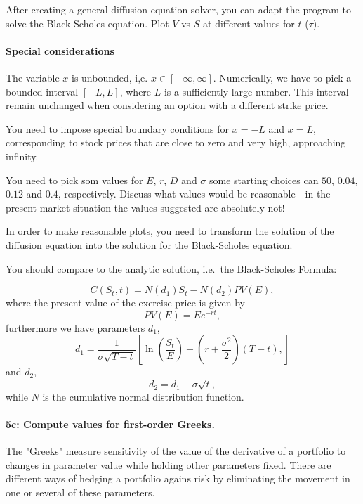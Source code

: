 \documentclass[%
oneside,                 %
final,                   %
10pt]{article}
\begin{document}
After creating a general diffusion equation solver, you
can adapt the program to solve the Black-Scholes equation.
Plot $V$ vs $S$ at different values for $t$ ($\tau$).

\paragraph{Special considerations}
The variable $x$ is unbounded, i,e. $x\in[-\infty, \infty]$. Numerically,
we have to pick a bounded interval $[-L, L]$, where $L$ is a sufficiently 
large number. This interval remain unchanged when considering an option with a
different strike price.

You need to impose special boundary conditions for $x=-L$ and $x=L$, corresponding 
to stock prices that are close to zero and very high, approaching infinity.

You need to pick som values for $E$, $r$, $D$ and $\sigma$ some starting
choices can $50$, $0.04$, $0.12$ and $0.4$, respectively. Discuss what 
values would be reasonable - in the present market situation the values 
suggested are absolutely not!

In order to make reasonable plots, you need to transform the solution of 
the diffusion equation into the solution for the Black-Scholes 
equation. 

You should compare to the analytic solution, i.e.~the Black-Scholes Formula:

\begin{equation}
    C(S_t, t) = N(d_1) S_t - N(d_2) PV(E),
\end{equation}
where the present value of the exercise price is
given by
\begin{equation}
    PV(E) = Ee^{-rt},
\end{equation}
furthermore we have parameters $d_1$,
\begin{equation}    
    d_1 = \frac{1}{\sigma \sqrt{T - t}}
    \left[
        \ln \left(\frac{S_t}{E} \right) 
        + \left(r + \frac{\sigma^2}{2} \right) (T - t),
    \right] 
\end{equation}
and $d_2$,
\begin{equation}
    d_2 = d_1 - \sigma \sqrt{t},
\end{equation}
while $N$ is the cumulative normal distribution function.


\paragraph{5c: Compute values for first-order Greeks.}
The "Greeks" measure sensitivity of the value of the derivative of 
a portfolio to changes in parameter value while holding other 
parameters fixed. There are different ways of hedging a portfolio
agains risk by eliminating the movement in one or several of
these parameters.
\end{document}
